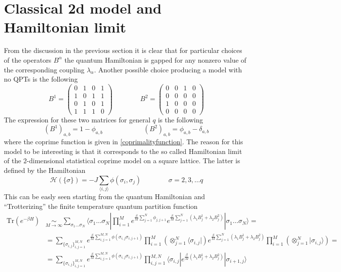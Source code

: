 \documentclass[aps,pra,superscriptaddress]{revtex4}
\newcommand\be            {\begin{equation}}
\newcommand\ee            {\end{equation}}
\renewcommand{\(}{\left(}
\renewcommand{\)}{\right)}
\renewcommand{\[}{\left[}
\renewcommand{\]}{\right]}
\newcommand\ket[1]{|#1\rangle}
\newcommand\bra[1]{\langle #1 |}
\newcommand\braket[3]{\langle #1 | #2 | #3 \rangle }
\begin{document}
\section{Classical 2d model and Hamiltonian limit}
From the discussion in the previous section it is clear that for particular choices of the operators $B^\alpha$ the quantum Hamiltonian is gapped for any nonzero value of the corresponding coupling $\lambda_\alpha$. Another possible choice producing a model with no QPTs is the following
\be 
B^1 = 
\begin{pmatrix}
0 & 1 & 0 & 1 \\
1 & 0 & 1 & 1 \\
0 & 1 & 0 & 1 \\
1 & 1 & 1 & 0 
\end{pmatrix}
\qquad
\qquad
B^2 = 
\begin{pmatrix}
0 & 0 & 1 & 0 \\
0 & 0 & 0 & 0 \\
1 & 0 & 0 & 0 \\
0 & 0 & 0 & 0 
\end{pmatrix}
\ee
The expression for these two matrices for general $q$ is the following
\be \label{hamlimbs}
(B^1)_{a,b}  = 1 - \phi_{a,b}
\qquad \qquad \qquad
(B^2)_{a,b} = \phi_{a,b} - \delta_{a,b} 
\ee
where the coprime function is given in \eqref{coprimalityfunction}. The reason for this model to be interesting is that it corresponds to the so called Hamiltonian limit \cite{kogut} of the $2$-dimensional statistical coprime model on a square lattice. The latter is defined by the Hamiltonian
\be \label{classham}
\mathcal{ H } ( \{ \sigma \} ) = -J \sum_{ \langle i , j \rangle } \phi ( \sigma_i , \sigma_j )
\qquad \qquad
\sigma = 2,3,\dots q 
\ee
This can be easly seen starting from the quantum Hamiltonian and ``Trotterizing'' the finite temperature quantum partition function
\begin{align}
\mathrm{Tr} \( e^{-\beta H } \) & \underset{ M \to \infty}{ \sim }  \sum_{ \sigma_1 \dots \sigma_N } \braket{ \sigma_1 \dots \sigma_N }{ \prod_{i=1}^M e^{ \frac{\beta}{M} \sum_{j=1}^N \phi_{j,j+1} } e^{  \frac{\beta}{M} \sum_{j=1}^N ( \lambda_1 B^1_j + \lambda_2 B^2_j ) } }{  \sigma_1 \dots \sigma_N } =  \\[1mm]
 &  =  \sum_{ \{ \sigma_{i,j} \}_{i,j=1}^{M,N} } e^{ \frac{\beta}{M} \sum_{i,j=1}^{M,N} \phi (\sigma_{i,j}\sigma_{i,j+1}) }  \prod_{i=1}^M \( \otimes_{j=1}^{N}  \bra{  \sigma_{i,j} } \) { e^{  \frac{\beta}{M} \sum_{j=1}^N ( \lambda_1 B^1_j + \lambda_2 B^2_j ) } } \prod_{i=1}^M  \( \otimes_{j=1}^{N}  \ket{  \sigma_{i,j} } \) = \\[1mm]
  & = \sum_{ \{ \sigma_{i,j} \}_{i,j=1}^{M,N} } e^{ \frac{\beta}{M} \sum_{i,j=1}^{M,N} \phi (\sigma_{i,j}\sigma_{i,j+1}) }  \prod_{i,j=1}^{M,N} \braket{ \sigma_{i,j}  }{ e^{  \frac{\beta}{M} ( \lambda_1 B^1_j + \lambda_2 B^2_j ) } }{ \sigma_{{i+1},j}  } \label{quant}
\end{align}
\end{document}

